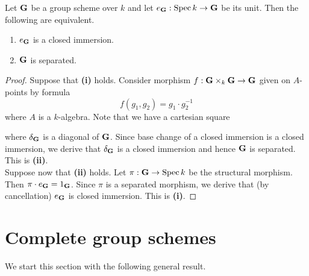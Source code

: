 \begin{proposition}\label{proposition:separatedness_criterion}
Let $\mathbf{G}$ be a group scheme over $k$ and let $e_{\mathbf{G}}:\mathrm{Spec}\, k\rightarrow \mathbf{G}$ be its unit. Then the following are equivalent.
\begin{enumerate}[label=\emph{\textbf{(\roman*)}}, leftmargin=3.0em]
\item $e_{\mathbf{G}}$ is a closed immersion.
\item $\mathbf{G}$ is separated.
\end{enumerate}
\end{proposition}
\begin{proof}
Suppose that \textbf{(i)} holds. Consider morphism $f:\mathbf{G}\times_k\mathbf{G}\rightarrow \mathbf{G}$ given on $A$-points by formula
$$f(g_1,g_2) = g_1\cdot g_2^{-1}$$
where $A$ is a $k$-algebra. Note that we have a cartesian square
\begin{center}
\end{center}
where $\delta_{\mathbf{G}}$ is a diagonal of $\mathbf{G}$. Since base change of a closed immersion is a closed immersion, we derive that $\delta_{\mathbf{G}}$ is a closed immersion and hence $\mathbf{G}$ is separated. This is \textbf{(ii)}.\\
Suppose now that \textbf{(ii)} holds. Let $\pi:\mathbf{G}\rightarrow \mathrm{Spec}\, k$ be the structural morphism. Then $\pi\cdot e_{\mathbf{G}} = 1_{\mathbf{G}}$. Since $\pi$ is a separated morphism, we derive that (by cancellation) $e_{\mathbf{G}}$ is closed immersion. This is \textbf{(i)}.
\end{proof}

\section{Complete group schemes}
\noindent
We start this section with the following general result.


